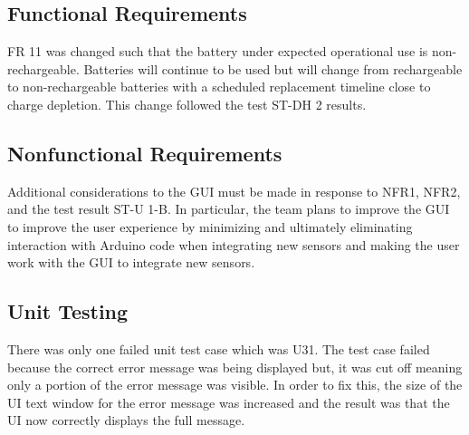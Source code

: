 \documentclass[12pt, titlepage]{article}
\begin{document}
\subsection{Functional Requirements}
FR 11 was changed such that the battery under expected operational use is non-rechargeable. Batteries will continue to be used but will change from rechargeable to non-rechargeable batteries with a scheduled replacement timeline close to charge depletion. This change followed the test ST-DH 2 results. \\

\subsection{Nonfunctional Requirements}


Additional considerations to the GUI must be made in response to NFR1,  NFR2, and the test result ST-U 1-B. In particular, the team plans to improve the GUI to improve the user experience by minimizing and ultimately eliminating interaction with Arduino code when integrating new sensors and making the user work with the GUI to integrate new sensors. \\
		
\subsection{Unit Testing}
There was only one failed unit test case which was U31. The test case failed because the correct error message was being displayed but, it was cut off meaning only a portion of the error message was visible. In order to fix this, the size of the UI text window for the error message was increased and the result was that the UI now correctly displays the full message.
\end{document}
